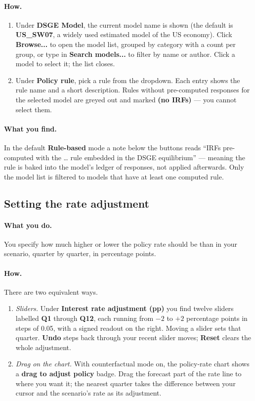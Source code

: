 \documentclass[11pt]{article}
\theoremstyle{definition}
\theoremstyle{remark}
\begin{document}
\paragraph{How.}
\begin{enumerate}
  \item Under \textbf{DSGE Model}, the current model name is shown (the
    default is \textbf{US\_SW07}, a widely used estimated model of the US
    economy). Click \textbf{Browse...} to open the model list, grouped by
    category with a count per group, or type in \textbf{Search models...} to
    filter by name or author. Click a model to select it; the list closes.
  \item Under \textbf{Policy rule}, pick a rule from the dropdown. Each entry
    shows the rule name and a short description. Rules without pre-computed
    responses for the selected model are greyed out and marked
    \textbf{(no IRFs)} --- you cannot select them.
\end{enumerate}

\paragraph{What you find.} In the default \textbf{Rule-based} mode a note
below the buttons reads ``IRFs pre-computed with the \ldots{} rule embedded in
the DSGE equilibrium'' --- meaning the rule is baked into the model's ledger of
responses, not applied afterwards. Only the model list is filtered to models
that have at least one computed rule.

\subsection{Setting the rate adjustment}

\paragraph{What you do.} You specify how much higher or lower the policy rate
should be than in your scenario, quarter by quarter, in percentage points.

\paragraph{How.} There are two equivalent ways.
\begin{enumerate}
  \item \emph{Sliders.} Under \textbf{Interest rate adjustment (pp)} you find
    twelve sliders labelled \textbf{Q1} through \textbf{Q12}, each running
    from $-2$ to $+2$ percentage points in steps of 0.05, with a signed
    readout on the right. Moving a slider sets that quarter. \textbf{Undo}
    steps back through your recent slider moves; \textbf{Reset} clears the
    whole adjustment.
  \item \emph{Drag on the chart.} With counterfactual mode on, the policy-rate
    chart shows a \textbf{drag to adjust policy} badge. Drag the forecast
    part of the rate line to where you want it; the nearest quarter takes the
    difference between your cursor and the scenario's rate as its adjustment.
\end{enumerate}
\end{document}
